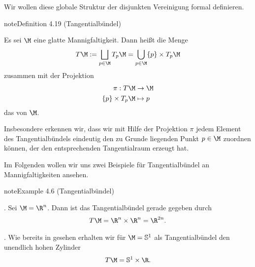 \documentclass[letterpaper,10pt,german]{jupyterBook}
\begin{document}
\sphinxAtStartPar
Wir wollen diese globale Struktur der disjunkten Vereinigung formal definieren.
\label{manifolds/tangential:definition-20}
\begin{sphinxadmonition}{note}{Definition 4.19 (Tangentialbündel)}



\sphinxAtStartPar
Es sei \(\M\) eine glatte Mannigfaltigkeit.
Dann heißt die Menge
\begin{equation*}
\begin{split}T\M := \bigsqcup_{p\in\M}  T_p\M = \bigcup_{p\in\M} \{p\} \times T_p\M\end{split}
\end{equation*}
\sphinxAtStartPar
zusammen mit der Projektion
\begin{equation*}
\begin{split}\pi:T\M &\to \M\\
\{p\}\times T_p\M &\mapsto p\end{split}
\end{equation*}
\sphinxAtStartPar
das  von \(\M\).
\end{sphinxadmonition}

\sphinxAtStartPar
Insbesondere erkennen wir, dass wir mit Hilfe der Projektion \(\pi\) jedem Element des Tangentialbündels eindeutig den zu Grunde liegenden Punkt \(p\in\M\) zuordnen können, der den entsprechenden Tangentialraum erzeugt hat.

\sphinxAtStartPar
Im Folgenden wollen wir uns zwei Beispiele für Tangentialbündel an Mannigfaltigkeiten ansehen.
\label{manifolds/tangential:example-21}
\begin{sphinxadmonition}{note}{Example 4.6 (Tangentialbündel)}





. Sei \(\M=\R^n\).
Dann ist das Tangentialbündel gerade gegeben durch
\begin{equation*}
\begin{split}T\M = \R^n\times\R^n = \R^{2n}.\end{split}
\end{equation*}


. Wie bereits in {\hyperref[\detokenize{manifolds/tangential:ex:tangentialS1}]{}} gesehen erhalten wir für \(\M=\mathbb{S}^1\) als Tangentialbündel den unendlich hohen Zylinder
\begin{equation*}
\begin{split}T\M = \mathbb{S}^1\times \R.\end{split}
\end{equation*}\end{sphinxadmonition}
\end{document}
